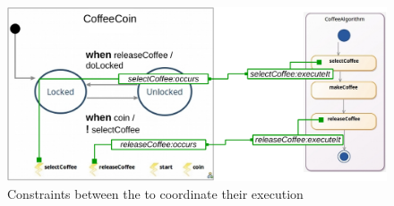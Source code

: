 	\begin{figure}[h]
		\begin{center}
			\includegraphics[width=.7\textwidth]{bcool/figs/tfsmandadcoord}
			\caption{Constraints between the \mse to coordinate their execution}
			\label{fig:tfsmandadcoord}
		\end{center}
	\end{figure}

